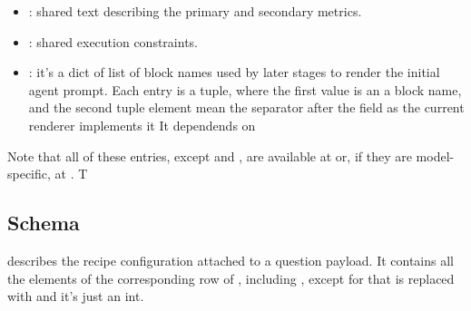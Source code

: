 \documentclass[11pt]{article}
\begin{document}
\begin{itemize}
\item {}: shared text describing the primary and secondary metrics.
\item {}: shared execution constraints.
\item {}: it's a dict of list of block names used by later stages to render the initial agent prompt. 
Each entry is a tuple, where the first value is an a block name, and the second tuple element mean the separator after the field as the current renderer implements it
It dependends on \termDescLevel

\end{itemize}
Note that all of these entries, except  and , are available at  or, if they are model-specific, at .
T
\subsection*{\texorpdfstring{}{recipe_info} Schema}

 describes the recipe configuration attached to a question payload. It contains all the elements of the corresponding row of , including , except for  that is replaced with  and it's just an int.
\end{document}
